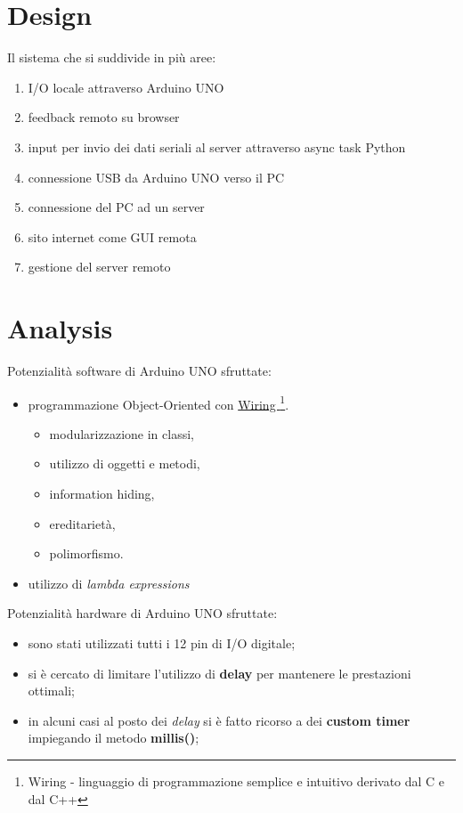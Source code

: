 \section{Design}
Il sistema che si suddivide in più aree:
\begin{enumerate}
	\item I/O locale attraverso Arduino UNO
	\item feedback remoto su browser
	\item input per invio dei dati seriali al server attraverso async task Python
	\item connessione USB da Arduino UNO verso il PC
	\item connessione del PC ad un server
	\item sito internet come GUI remota
	\item gestione del server remoto
\end{enumerate}


\section{Analysis}
Potenzialità software di Arduino UNO sfruttate:
\begin{itemize}
	\item programmazione Object-Oriented con \href{https://it.wikipedia.org/wiki/Wiring}{Wiring \footnote{Wiring - linguaggio di programmazione semplice e intuitivo derivato dal C e dal C++}}.
	\begin{itemize}
		\item modularizzazione in classi,
		\item utilizzo di oggetti e metodi,
		\item information hiding, 
		\item ereditarietà, 
		\item polimorfismo.
	\end{itemize}

	\item utilizzo di \textit{lambda expressions}
\end{itemize}
Potenzialità hardware di Arduino UNO sfruttate:
\begin{itemize}
	\item sono stati utilizzati tutti i 12 pin di I/O digitale;
	\item si è cercato di limitare l'utilizzo di \textbf{delay} per mantenere le prestazioni ottimali;
	\item in alcuni casi al posto dei \textit{delay} si è fatto ricorso a dei \textbf{custom timer} impiegando il metodo \textbf{millis()};
\end{itemize}